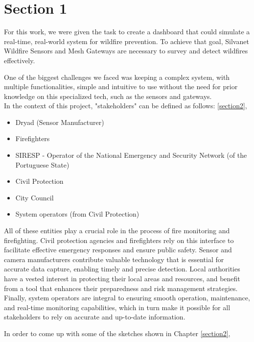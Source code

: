 \chapter{Section 1} \label{section1}
For this work, we were given the task to create a dashboard 
that could simulate a real-time, real-world system for wildfire 
prevention. To achieve
that goal, Silvanet Wildfire Sensors and Mesh Gateways are necessary to
survey and detect wildfires effectively. \par 
One of the biggest challenges we faced was keeping a complex system, with multiple functionalities, simple
and intuitive to use without the need for prior knowledge on this
specialized tech, such as the sensors and gateways. \\
In the context of this project, "stakeholders" can be defined as follows:
\ref{section2}, 
\begin{itemize}
    \item Dryad (Sensor Manufacturer)
    \item Firefighters
    \item SIRESP - Operator of the National Emergency and Security Network (of the Portuguese State)
    \item Civil Protection
    \item City Council
    \item System operators (from Civil Protection)
\end{itemize} \par 
All of these entities play a crucial role in the process of fire monitoring and firefighting. Civil protection agencies and firefighters rely on this interface to facilitate effective emergency responses and ensure public safety. Sensor and camera manufacturers contribute valuable technology that is essential for accurate data capture, enabling timely and precise detection. Local authorities have a vested interest in protecting their local areas and resources, and benefit from a tool that enhances their preparedness and risk management strategies. Finally, system operators are integral to ensuring smooth operation, maintenance, and real-time monitoring capabilities, which in turn make it possible for all stakeholders to rely on accurate and up-to-date information.

In order to come up with some of the sketches shown in Chapter \ref{section2},
 \\

